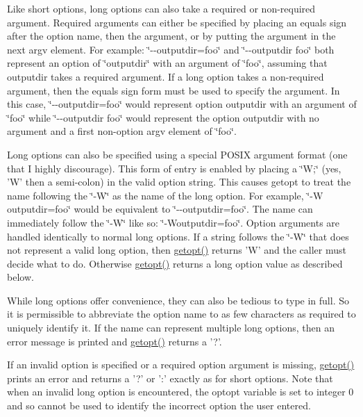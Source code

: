 Like short options, long options can also take a required or non-\/required argument. Required arguments can either be specified by placing an equals sign after the option name, then the argument, or by putting the argument in the next argv element. For example: \char`\"{}-\/-\/outputdir=foo\char`\"{} and \char`\"{}-\/-\/outputdir foo\char`\"{} both represent an option of \char`\"{}outputdir\char`\"{} with an argument of \char`\"{}foo\char`\"{}, assuming that outputdir takes a required argument. If a long option takes a non-\/required argument, then the equals sign form must be used to specify the argument. In this case, \char`\"{}-\/-\/outputdir=foo\char`\"{} would represent option outputdir with an argument of \char`\"{}foo\char`\"{} while \char`\"{}-\/-\/outputdir foo\char`\"{} would represent the option outputdir with no argument and a first non-\/option argv element of \char`\"{}foo\char`\"{}. 

Long options can also be specified using a special POSIX argument format (one that I highly discourage). This form of entry is enabled by placing a \char`\"{}W;\char`\"{} (yes, 'W' then a semi-\/colon) in the valid option string. This causes getopt to treat the name following the \char`\"{}-\/W\char`\"{} as the name of the long option. For example, \char`\"{}-\/W outputdir=foo\char`\"{} would be equivalent to \char`\"{}-\/-\/outputdir=foo\char`\"{}. The name can immediately follow the \char`\"{}-\/W\char`\"{} like so: \char`\"{}-\/Woutputdir=foo\char`\"{}. Option arguments are handled identically to normal long options. If a string follows the \char`\"{}-\/W\char`\"{} that does not represent a valid long option, then \hyperlink{classgnu_1_1getopt_1_1_getopt_a49e6fc6e18756f5dfaf85c1067325c3b}{getopt()} returns 'W' and the caller must decide what to do. Otherwise \hyperlink{classgnu_1_1getopt_1_1_getopt_a49e6fc6e18756f5dfaf85c1067325c3b}{getopt()} returns a long option value as described below. 

While long options offer convenience, they can also be tedious to type in full. So it is permissible to abbreviate the option name to as few characters as required to uniquely identify it. If the name can represent multiple long options, then an error message is printed and \hyperlink{classgnu_1_1getopt_1_1_getopt_a49e6fc6e18756f5dfaf85c1067325c3b}{getopt()} returns a '?'. 

If an invalid option is specified or a required option argument is missing, \hyperlink{classgnu_1_1getopt_1_1_getopt_a49e6fc6e18756f5dfaf85c1067325c3b}{getopt()} prints an error and returns a '?' or ':' exactly as for short options. Note that when an invalid long option is encountered, the optopt variable is set to integer 0 and so cannot be used to identify the incorrect option the user entered. 

